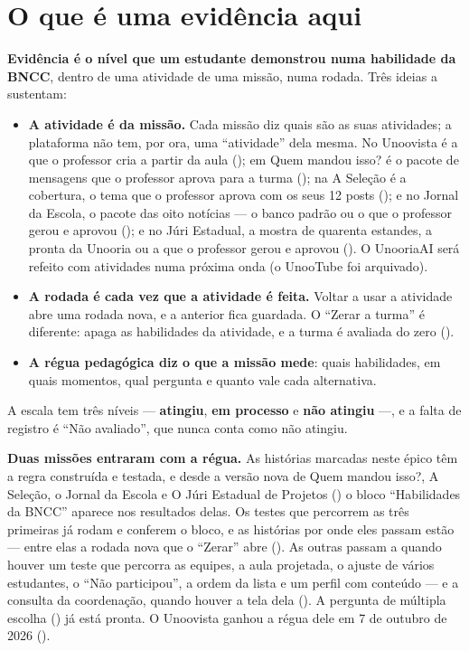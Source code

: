 \section{O que é uma evidência aqui}

\textbf{Evidência é o nível que um estudante demonstrou numa habilidade da
BNCC}, dentro de uma atividade de uma missão, numa rodada. Três ideias a
sustentam:

\begin{itemize}
  \item \textbf{A atividade é da missão.} Cada missão diz quais são as suas
    atividades; a plataforma não tem, por ora, uma \enquote{atividade} dela
    mesma. No Unoovista é a que o professor cria a partir da aula
    (); em Quem mandou isso? é o pacote de mensagens que o
    professor aprova para a turma (); na A Seleção é a cobertura,
    o tema que o professor aprova com os seus 12 posts (); e no
    Jornal da Escola, o pacote das oito notícias --- o banco padrão ou o que o
    professor gerou e aprovou (); e no Júri Estadual, a mostra de
    quarenta estandes, a pronta da Unooria ou a que o professor gerou e aprovou (). O UnooriaAI será refeito com
    atividades numa próxima onda (o UnooTube foi arquivado).
  \item \textbf{A rodada é cada vez que a atividade é feita.} Voltar a usar a
    atividade abre uma rodada nova, e a anterior fica guardada. O
    \enquote{Zerar a turma} é diferente: apaga as habilidades da atividade, e a
    turma é avaliada do zero ().
  \item \textbf{A régua pedagógica diz o que a missão mede}: quais habilidades,
    em quais momentos, qual pergunta e quanto vale cada alternativa.
\end{itemize}

A escala tem três níveis --- \textbf{atingiu}, \textbf{em processo} e
\textbf{não atingiu} ---, e a falta de registro é \enquote{Não avaliado}, que
nunca conta como não atingiu.

\begin{nota}
\textbf{Duas missões entraram com a régua.} As histórias marcadas
\parcial{} neste épico têm a regra construída e testada, e desde a versão nova
de Quem mandou isso?, A Seleção, o Jornal da Escola e O Júri Estadual de
Projetos () o bloco \enquote{Habilidades da BNCC} aparece nos
resultados delas. Os testes que percorrem as três primeiras já
rodam e conferem o bloco, e as histórias por onde eles passam estão \pronto{} ---
entre elas a rodada nova que o \enquote{Zerar} abre (). As outras
passam a \pronto{} quando houver um teste que percorra as equipes, a aula
projetada, o ajuste de vários estudantes, o \enquote{Não participou}, a ordem
da lista e um perfil com conteúdo --- e a consulta da coordenação, quando
houver a tela dela (). A pergunta de múltipla escolha
() já está pronta. O Unoovista ganhou a régua dele em 7 de
outubro de 2026 ().
\end{nota}

